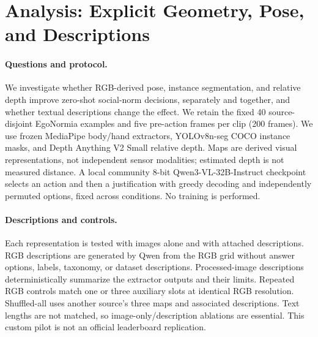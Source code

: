 \section{Analysis: Explicit Geometry, Pose, and Descriptions}
\paragraph{Questions and protocol.} We investigate whether RGB-derived pose, instance segmentation, and relative depth improve zero-shot social-norm decisions, separately and together, and whether textual descriptions change the effect. We retain the fixed 40 source-disjoint EgoNormia examples and five pre-action frames per clip (200 frames). We use frozen MediaPipe body/hand extractors, YOLOv8n-seg COCO instance masks, and Depth Anything V2 Small relative depth. Maps are derived visual representations, not independent sensor modalities; estimated depth is not measured distance. A local community 8-bit Qwen3-VL-32B-Instruct checkpoint selects an action and then a justification with greedy decoding and independently permuted options, fixed across conditions. No training is performed.
\paragraph{Descriptions and controls.} Each representation is tested with images alone and with attached descriptions. RGB descriptions are generated by Qwen from the RGB grid without answer options, labels, taxonomy, or dataset descriptions. Processed-image descriptions deterministically summarize the extractor outputs and their limits. Repeated RGB controls match one or three auxiliary slots at identical RGB resolution. Shuffled-all uses another source's three maps and associated descriptions. Text lengths are not matched, so image-only/description ablations are essential. This custom pilot is not an official leaderboard replication.
